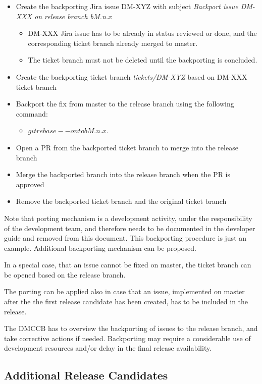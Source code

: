 \begin{itemize}
\item Create the backporting Jira issue DM-XYZ with subject \textit{Backport issue DM-XXX on release branch bM.n.x}
  \begin{itemize}
  \item DM-XXX Jira issue has to be already in status reviewed or done, and the corresponding ticket branch already merged to master. 
  \item The ticket branch must not be deleted  until the backporting is concluded.
  \end{itemize}
\item Create the backporting ticket branch \textit{tickets/DM-XYZ}  based on DM-XXX ticket branch
\item Backport the fix from master to the release branch using the following command: 
  \begin{itemize}
   \item $git rebase --onto bM.n.x$.
  \end{itemize}
\item Open a PR from the backported ticket branch to merge into the release branch
\item Merge the backported branch into the release branch when the PR is approved
\item Remove the backported ticket branch and the original ticket branch
\end{itemize}

Note that porting mechanism is a development activity, under the responsibility of the development team, and therefore needs to be documented in the developer guide and removed from this document.
This backporting procedure is just an example. Additional backporting mechanism can be proposed.

In a special case, that an issue cannot be fixed on master, the ticket branch can be opened based on the release branch.

The porting can be applied also in case that an issue, implemented on master after the the first release candidate has been created, has to be included in the release.

The DMCCB has to overview the backporting of issues to the release branch, and take corrective actions if needed. Backporting may require a considerable use of development resources and/or delay in the final release availability.


\subsection{Additional Release Candidates} \label{sec:newrc}


